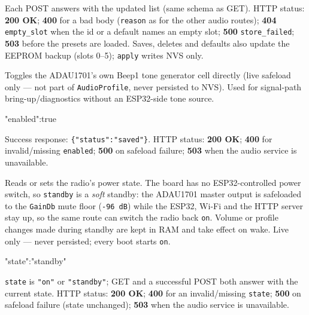 Each POST answers with the updated list (same schema as GET). HTTP status:
\textbf{200 OK}; \textbf{400} for a bad body (\texttt{reason} as for the
other audio routes); \textbf{404} \texttt{empty\_slot} when the id or a
default names an empty slot; \textbf{500} \texttt{store\_failed};
\textbf{503} before the presets are loaded. Saves, deletes and defaults
also update the EEPROM backup (slots 0--5); \texttt{apply} writes NVS only.

\label{sec:api-audio-beep}

Toggles the ADAU1701's own Beep1 tone generator cell directly (live
safeload only --- not part of \texttt{AudioProfile}, never persisted to
NVS). Used for signal-path bring-up/diagnostics without an ESP32-side
tone source.

\begin{drnote}
\begin{drcode}[JSON]
{"enabled":true}
\end{drcode}
\end{drnote}

Success response: \texttt{\{"status":"saved"\}}. HTTP status:
\textbf{200 OK}; \textbf{400} for invalid/missing \texttt{enabled};
\textbf{500} on safeload failure; \textbf{503} when the audio service is
unavailable.

\label{sec:api-system-power}

Reads or sets the radio's power state. The board has no ESP32-controlled
power switch, so \texttt{standby} is a \emph{soft} standby: the ADAU1701
master output is safeloaded to the \texttt{GainDb} mute floor
(\texttt{-96 dB}) while the ESP32, Wi-Fi and the HTTP server stay up, so the
same route can switch the radio back \texttt{on}. Volume or profile
changes made during standby are kept in RAM and take effect on wake. Live
only --- never persisted; every boot starts \texttt{on}.

\begin{drnote}
\begin{drcode}[JSON]
{"state":"standby"}
\end{drcode}
\end{drnote}

\texttt{state} is \texttt{"on"} or \texttt{"standby"}; GET and a successful
POST both answer with the current state. HTTP status: \textbf{200 OK};
\textbf{400} for an invalid/missing \texttt{state}; \textbf{500} on
safeload failure (state unchanged); \textbf{503} when the audio service is
unavailable.

